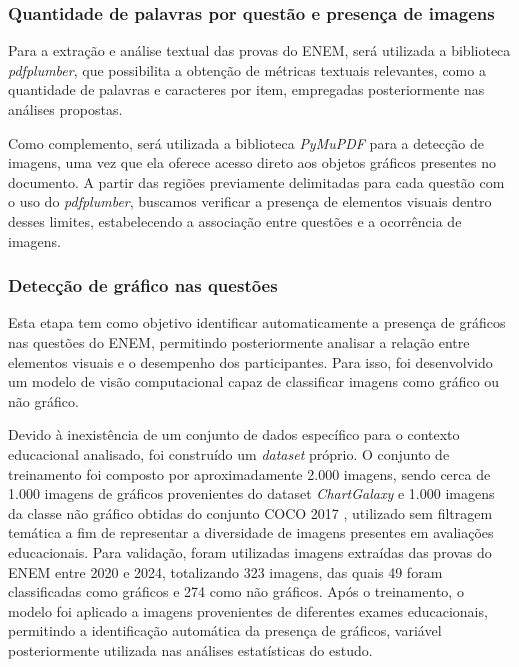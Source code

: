 \documentclass[a4paper,10pt, twocolumn]{article}
\begin{document}
\subsubsection{Quantidade de palavras por questão e presença de imagens} 

Para a extração e análise textual das provas do ENEM, será utilizada a biblioteca \textit{pdfplumber}, que possibilita a obtenção de métricas textuais relevantes, como a quantidade de palavras e caracteres por item, empregadas posteriormente nas análises propostas.

Como complemento, será utilizada a biblioteca \textit{PyMuPDF} para a detecção de imagens, uma vez que ela oferece acesso direto aos objetos gráficos presentes no documento. A partir das regiões previamente delimitadas para cada questão com o uso do \textit{pdfplumber}, buscamos verificar a presença de elementos visuais dentro desses limites, estabelecendo a associação entre questões e a ocorrência de imagens.

\subsubsection{Detecção de gráfico nas questões}

Esta etapa tem como objetivo identificar automaticamente a presença de
gráficos nas questões do ENEM, permitindo posteriormente analisar a
relação entre elementos visuais e o desempenho dos participantes.
Para isso, foi desenvolvido um modelo de visão computacional capaz de
classificar imagens como gráfico ou não gráfico.

Devido à inexistência de um conjunto de dados específico para o contexto
educacional analisado, foi construído um \textit{dataset} próprio. O conjunto de treinamento foi composto por aproximadamente 2.000 imagens, sendo cerca
de 1.000 imagens de gráficos provenientes do dataset \textit{ChartGalaxy} \cite{li2025chartgalaxy} e 1.000 imagens da classe não gráfico obtidas do conjunto COCO 2017 \cite{coco_dataset}, utilizado sem filtragem temática a fim de representar a diversidade de imagens presentes em avaliações educacionais. Para validação, foram utilizadas imagens extraídas das provas do ENEM entre 2020 e 2024, totalizando 323 imagens, das quais 49 foram classificadas como gráficos e 274 como não gráficos. Após o treinamento, o modelo foi aplicado a imagens provenientes de diferentes exames educacionais, permitindo a identificação automática da presença de gráficos, variável posteriormente utilizada nas análises estatísticas do estudo.
\end{document}
